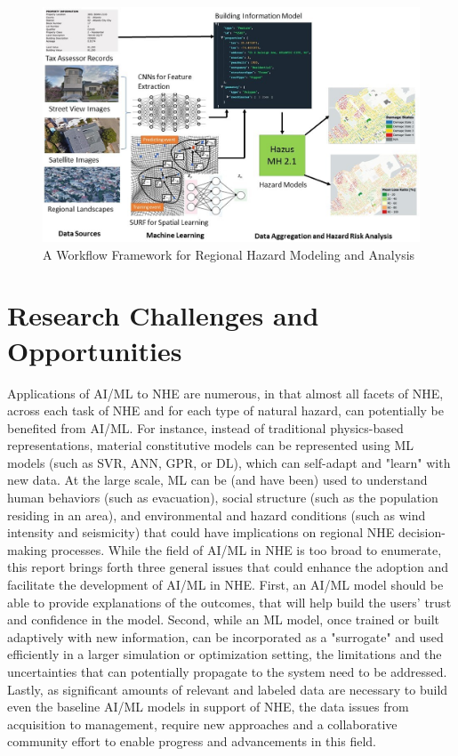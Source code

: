 \begin{figure}[htb]
    \centering
    \includegraphics[width=1.0\textwidth, angle = 0]{Figures/AI_workflow_for_regional_analysis.png}
    \caption{A Workflow Framework for Regional Hazard Modeling and Analysis}
    \label{fig:AI_workflow_for_regional_analysis}
\end{figure}

\section{Research Challenges and Opportunities}
\label{sec:ai_gaps}

Applications of AI/ML to NHE are numerous, in that almost all facets of NHE, across each task of NHE and for each type of natural hazard, can potentially be benefited from AI/ML. For instance, instead of traditional physics-based representations, material constitutive models can be represented using ML models (such as SVR, ANN, GPR, or DL), which can self-adapt and "learn" with new data. At the large scale, ML can be (and have been) used to understand human behaviors (such as evacuation), social structure (such as the population residing in an area), and environmental and hazard conditions (such as wind intensity and seismicity) that could have implications on regional NHE decision-making processes. While the field of AI/ML in NHE is too broad to enumerate, this report brings forth three general issues that could enhance the adoption and facilitate the development of AI/ML in NHE. First, an AI/ML model should be able to provide explanations of the outcomes, that will help build the users’ trust and confidence in the model. Second, while an ML model, once trained or built adaptively with new information, can be incorporated as a "surrogate" and used efficiently in a larger simulation or optimization setting, the limitations and the uncertainties that can potentially propagate to the system need to be addressed. Lastly, as significant amounts of relevant and labeled data are necessary to build even the baseline AI/ML models in support of NHE, the data issues from acquisition to management, require new approaches and a collaborative community effort to enable progress and advancements in this field. 

